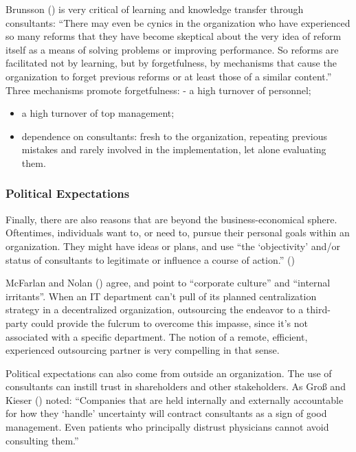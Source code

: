 \documentclass[
  man,floatsintext]{apa6}
\begin{document}
Brunsson () is very critical of learning and knowledge transfer through consultants: ``There may even be cynics in the organization who have experienced so many reforms that they have become skeptical about the very idea of reform itself as a means of solving problems or improving performance. So reforms are facilitated not by learning, but by forgetfulness, by mechanisms that cause the organization to forget previous reforms or at least those of a similar content.'' Three mechanisms promote forgetfulness: - a high turnover of personnel;

\begin{itemize}
\item
  a high turnover of top management;
\item
  dependence on consultants: fresh to the organization, repeating previous mistakes and rarely involved in the implementation, let alone evaluating them.
\end{itemize}

\subsubsection{Political Expectations}\label{political-expectations}

Finally, there are also reasons that are beyond the business-economical sphere. Oftentimes, individuals want to, or need to, pursue their personal goals within an organization. They might have ideas or plans, and use ``the `objectivity' and/or status of consultants to legitimate or influence a course of action.'' ()

McFarlan and Nolan () agree, and point to ``corporate culture'' and ``internal irritants''. When an IT department can't pull of its planned centralization strategy in a decentralized organization, outsourcing the endeavor to a third-party could provide the fulcrum to overcome this impasse, since it's not associated with a specific department. The notion of a remote, efficient, experienced outsourcing partner is very compelling in that sense.

Political expectations can also come from outside an organization. The use of consultants can instill trust in shareholders and other stakeholders. As Groß and Kieser () noted: ``Companies that are held internally and externally accountable for how they `handle' uncertainty will contract consultants as a sign of good management. Even patients who principally distrust physicians cannot avoid consulting them.''
\end{document}
